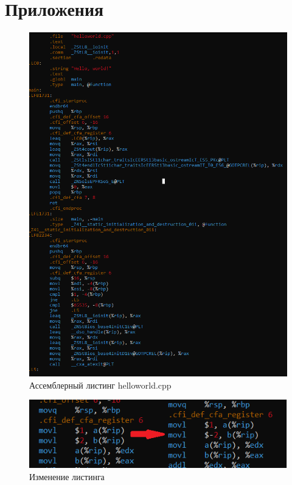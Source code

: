 \documentclass[a4paper,12pt]{article}
\begin{document}
\section*{Приложения}

\begin{figure}[h]
  \centering
  \includegraphics[width=0.8\linewidth]{images/asm0_0.png}
  \caption{Ассемблерный листинг helloworld.cpp}
\end{figure}

\begin{figure}[h]
  \centering
  \includegraphics[width=0.8\linewidth]{images/asm0_1.png}
  \caption{Изменение листинга}
\end{figure}
\end{document}
